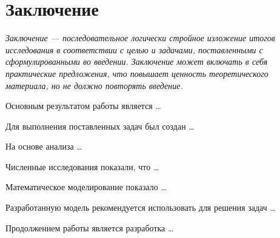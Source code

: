 \chapter*{Заключение}                       %


\textit{Заключение --- последовательное логически стройное изложение итогов исследования в соответствии с целью и задачами, поставленными с сформулированными во введении.
Заключение может включать в себя практические предложения, что повышает ценность теоретического материала, но не должно повторять введение.}
\bigskip

Основным результатом работы является \dots

Для выполнения поставленных задач был создан \dots

На основе анализа \dots

Численные исследования показали, что \dots

Математическое моделирование показало \dots

Разработанную модель рекомендуется использовать для решения задач \dots

Продолжением работы является разработка \dots
